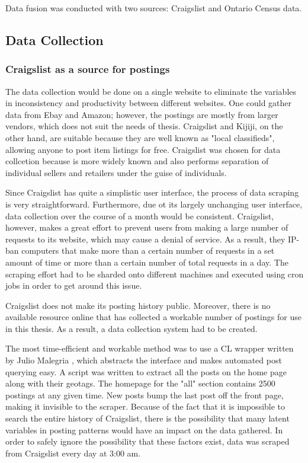 \documentclass[12pt]{article}
\begin{document}
Data fusion was conducted with two sources: Craigslist and Ontario Census data. 

\subsection{Data Collection}
\subsubsection{Craigslist as a source for postings}
The data collection would be done on a single website to eliminate the variables in inconsistency and productivity between different websites. One could gather data from Ebay and Amazon; however, the postings are mostly from larger vendors, which does not suit the needs of thesis. Craigslist and Kijiji, on the other hand, are suitable because they are well known as "local classifieds", allowing anyone to post item listings for free. Craigslist was chosen for data collcetion because is more widely known and also performs separation of individual sellers and retailers under the guise of individuals. 

Since Craigslist has quite a simplistic user interface, the process of data scraping is very straightforward. Furthermore, due ot its largely unchanging user interface, data collection over the course of a month would be consistent. Craigslist, however, makes a great effort to prevent users from making a large number of requests to its website, which may cause a denial of service. As a result, they IP-ban computers that make more than a certain number of requests in a set amount of time or more than a certain number of total requests in a day. The scraping effort had to be sharded onto different machines and executed using cron jobs in order to get around this issue.

Craigslist does not make its posting history public. Moreover, there is no available resource online that has collected a workable number of postings for use in this thesis. As a result, a data collection system had to be created.

The most time-efficient and workable method was to use a CL wrapper written by Julio Malegria \cite{clwrapper}, which abstracts the interface and makes automated post querying easy. A script was written to extract all the posts on the home page along with their geotags. The homepage for the "all" section contains 2500 postings at any given time. New posts bump the last post off the front page, making it invisible to the scraper. Because of the fact that it is impossible to search the entire history of Craigslist, there is the possibility that many latent variables in posting patterns would have an impact on the data gathered. In order to safely ignore the possibility that these factors exist, data was scraped from Craigslist every day at 3:00 am. 
\end{document}
